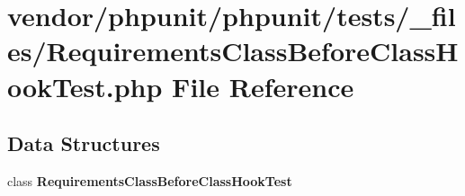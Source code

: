 \section{vendor/phpunit/phpunit/tests/\+\_\+files/\+Requirements\+Class\+Before\+Class\+Hook\+Test.php File Reference}
\label{_requirements_class_before_class_hook_test_8php}
\subsection*{Data Structures}
\begin{DoxyCompactItemize}
\item 
class {\bf Requirements\+Class\+Before\+Class\+Hook\+Test}
\end{DoxyCompactItemize}
